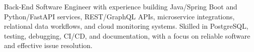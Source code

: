 \par{
Back-End Software Engineer with experience building Java/Spring Boot and Python/FastAPI services, REST/GraphQL APIs, microservice integrations, relational data workflows, and cloud monitoring systems. Skilled in PostgreSQL, testing, debugging, CI/CD, and documentation, with a focus on reliable software and effective issue resolution.
}
